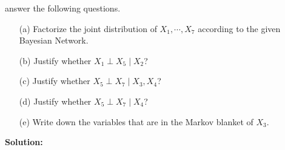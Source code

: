 \documentclass[10pt]{article}
\begin{document}
\begin{enumerate}[1.]
	answer the following questions.
		\begin{itemize}
			\item[(a)] Factorize the joint distribution of $X_{1},\cdots,X_{7}$ according 
			to the given Bayesian Network.~ 
			\item[(b)] Justify whether $X_{1}\perp X_{5}\mid X_{2}$?~ 
			\item[(c)] Justify whether $X_{5}\perp X_{7}\mid X_{3},X_{4}$?~ 
			\item[(d)] Justify whether $X_{5}\perp X_{7}\mid X_{4}$?~ 
			\item[(e)] Write down the variables that are in the Markov blanket of $X_{3}$.~ 
		\end{itemize}

		\textbf{Solution:}

\end{enumerate}
\end{document}
